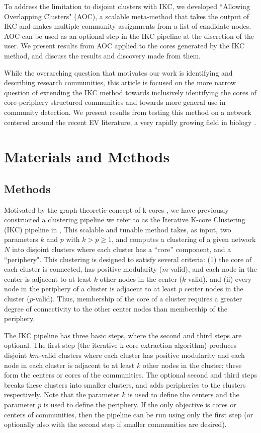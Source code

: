 \documentclass[12pt, oneside]{article}   	%
\begin{document}
To address the limitation to disjoint clusters with IKC, we developed  ``Allowing Overlapping Clusters" (AOC), a scalable meta-method that takes the output of IKC and makes multiple community assignments from a list of candidate nodes. AOC can be used as an optional step in the IKC pipeline at the discretion of the user. We present results from AOC applied to the cores generated by the IKC method, and discuss the results and discovery made from them. 

While the overarching question that motivates our work is identifying and describing research communities, this article is focused on the more narrow question of extending the IKC method towards inclusively identifying the cores of core-periphery structured communities and towards more general use in community detection. We present results from testing this method on a network centered around the recent EV literature, a very rapidly growing field in biology \citep{van2022challenges}. 
 
\section{Materials and Methods}

\subsection{Methods} Motivated by the graph-theoretic concept of k-cores \citep{Giatsidis2011,malliaros2019}, we have previously constructed a clustering pipeline we refer to as  the Iterative K-core Clustering (IKC) pipeline in \cite{Wedell2022}, This scalable and tunable method takes, as input, two parameters $k$ and $p$ with $k > p \geq 1$, and computes a clustering of a given network $N$ into disjoint clusters where each cluster has a ``core'' component, and a ``periphery". This clustering is designed to satisfy several criteria: (1) the core of each cluster is connected,  has positive modularity ($m$-valid), and each node in the center  is adjacent to at least $k$ other nodes in the center ($k$-valid), and (ii) every node in the periphery of a cluster is adjacent to at least $p$ center nodes in the cluster ($p$-valid). Thus, membership of the core of a cluster requires a greater degree of connectivity to the other center nodes than membership of the periphery. 

The IKC pipeline has three basic steps, where the second and third steps are optional.  The first step (the iterative k-core extraction algorithm) produces disjoint $km$-valid clusters where each cluster has positive modularity and each node in each cluster is adjacent to at least $k$ other nodes in the cluster; these form the centers or cores of the communities. The optional second and third steps breaks these clusters into smaller clusters, and adds peripheries to the clusters respectively.  Note that the parameter $k$ is used to define the centers and the parameter $p$ is used to define the periphery. If the only objective is cores or centers of communities, then the pipeline can be run using only the first step (or optionally also with the second step if smaller communities are desired).
\end{document}
